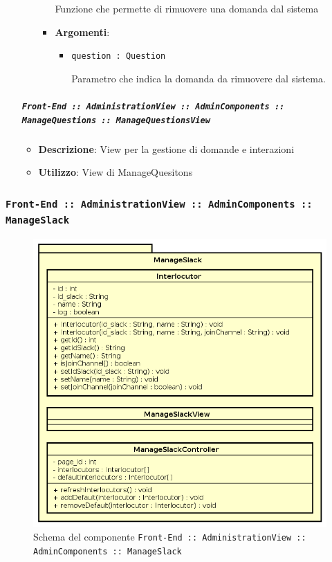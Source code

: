 \documentclass[../DefinizioneDiProdotto.tex]{subfiles}
\begin{document}
\begin{itemize}
\begin{itemize}
\begin{itemize}
	 Funzione che permette di rimuovere una domanda dal sistema

	\item \textbf{Argomenti}:
	\begin{itemize}
	\item \texttt{question : Question}\

	 Parametro che indica la domanda da rimuovere dal sistema.
	\end{itemize}
	\end{itemize}\vspace{0.5em}
	\end{itemize}\subparagraph{\texttt{Front-End :: AdministrationView :: AdminComponents :: ManageQuestions :: ManageQuestionsView}}
	\begin{itemize}\item \textbf{Descrizione}: View per la gestione di domande e interazioni
	\item \textbf{Utilizzo}: View di ManageQuesitons
	\end{itemize}\end{itemize}

	\newpage
	\subsubsection{ \texttt{Front-End :: AdministrationView :: AdminComponents :: ManageSlack}}
		\begin{figure}[!h]
			\centering
			\includegraphics[scale=0.5]{Architettura/Front-End/Administration/AdminComponents/ManageSlack.png}
			\caption{Schema del componente \texttt{Front-End :: AdministrationView :: AdminComponents :: ManageSlack}}
		\end{figure}
\end{document}
